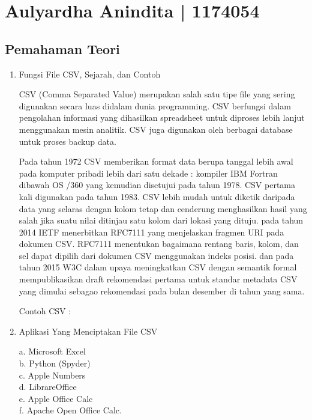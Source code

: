 \section{Aulyardha Anindita | 1174054}

\subsection{Pemahaman Teori}
\begin{enumerate}
\item Fungsi File CSV, Sejarah, dan Contoh

CSV (Comma Separated Value) merupakan salah satu tipe file yang sering digunakan secara luas didalam dunia programming. CSV berfungsi dalam pengolahan informasi yang dihasilkan spreadsheet untuk diproses lebih lanjut menggunakan mesin analitik. CSV juga digunakan oleh berbagai database untuk proses backup data.

Pada tahun 1972 CSV memberikan format data berupa tanggal lebih awal pada komputer pribadi lebih dari satu dekade : kompiler IBM Fortran dibawah OS /360 yang kemudian disetujui pada tahun 1978. CSV pertama kali digunakan pada tahun 1983. CSV lebih mudah untuk diketik daripada data yang selaras dengan kolom tetap dan cenderung menghasilkan hasil yang salah jika suatu nilai ditinjau satu kolom dari lokasi yang dituju. pada tahun 2014 IETF menerbitkan RFC7111 yang menjelaskan fragmen URI pada dokumen CSV. RFC7111 menentukan bagaimana rentang baris, kolom, dan sel dapat dipilih dari dokumen CSV menggunakan indeks posisi. dan pada tahun 2015 W3C dalam upaya meningkatkan CSV dengan semantik formal mempublikasikan draft rekomendasi pertama untuk standar metadata CSV yang dimulai sebagao rekomendasi pada bulan desember di tahun yang sama.

Contoh CSV :\\


\item Aplikasi Yang Menciptakan File CSV

a. Microsoft Excel\\
b. Python (Spyder)\\
c. Apple Numbers\\
d. LibrareOffice\\
e. Apple Office Calc\\
f. Apache Open Office Calc.


\end{enumerate}

